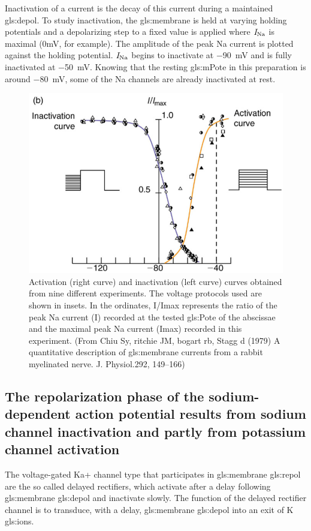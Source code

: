 \documentclass[class={myRUCProject}, crop=false]{standalone}
\begin{document}
Inactivation of a current is the decay of this current during a maintained \gls{gls:depol}. To study inactivation, the \gls{gls:membrane} is held at varying holding potentials and a depolarizing step to a fixed value is applied where \(\mathit{I}_\mathrm{Na}\) is maximal (0mV, for example). The amplitude of the peak \gls{Na} current is plotted against the holding potential. \(\mathit{I}_\mathrm{Na}\) begins to inactivate at \qty{-90}{\mV} and is fully inactivated at \qty{-50}{\mV}. Knowing that the resting \gls{gls:mPote} in this preparation is around \qty{-80}{\mV}, some of the \gls{Na} channels are already inactivated at rest. 
\begin{figure}[H]
  \centering
  \includegraphics[width=0.5\linewidth]{Pictures//Anakin/activ-inactiv.png}
  \caption{Activation (right curve) and inactivation (left curve) curves obtained from nine different experiments. The voltage protocols used are shown in insets. In the ordinates, I/Imax represents the ratio of the peak \gls{Na} current (I) recorded at the tested \gls{gls:Pote} of the abscissae and the maximal peak \gls{Na} current (Imax) recorded in this experiment. (From Chiu Sy, ritchie JM, bogart rb, Stagg d (1979) A quantitative description of \gls{gls:membrane} currents from a rabbit myelinated nerve. J. Physiol.292, 149–166) }
  \label{fig:actinact}
\end{figure}

\subsection{The repolarization phase of the sodium-dependent action potential results from sodium channel inactivation and partly from potassium channel activation}

The voltage-gated Ka+ channel type that participates in \gls{gls:membrane} \gls{gls:repol} are the so called delayed rectifiers, which activate after a delay following \gls{gls:membrane} \gls{gls:depol} and inactivate slowly. The function of the delayed rectifier channel is to transduce, with a delay, \gls{gls:membrane} \gls{gls:depol} into an exit of \gls{K} \glspl{gls:ion}. 
\end{document}
